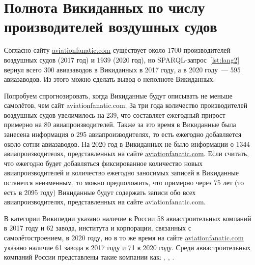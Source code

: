 \section{Полнота Викиданных по числу производителей воздушных судов}

Согласно сайту \href{https://www.aviationfanatic.com/}{aviationfanatic.com} 
существует около \num{1700} 
производителей воздушных судов\autocite{count_of_aircraft_manufactures} (2017 год) 
и \num{1939} (2020 год), 
но SPARQL-запрос~\ref{lst:lang2} вернул всего 300 авиазаводов в Викиданных в 2017 году, 
а в 2020 году~--- 595 авиазаводов. Из этого можно сделать вывод о неполноте Викиданных.  

Попробуем спрогнозировать, когда Викиданные будут описывать не меньше самолётов, 
чем сайт aviationfanatic.com. 
За три года количество производителей воздушных судов увеличилось на 239, 
что составляет ежегодный прирост примерно на 80 авиапроизводителей. 
Также за это время в Викиданные была занесена информация о 295 авиапроизводителях, 
то есть ежегодно добавляется около сотни авиазаводов. 
На 2020 год в Викиданных не было информации о \num{1344} авиапроизводителях, 
представленных на сайте \href{https://www.aviationfanatic.com/}{aviationfanatic.com}. 
Если считать, что ежегодно будет добавляться фиксированное количество новых авиапроизводителей 
и количество ежегодно заносимых записей в Викиданные останется неизменным, 
то можно предположить, что примерно через 75 лет (то есть в 2095 году) 
Викиданные будут содержать записи обо всех авиапроизводителях, представленных на сайте aviationfanatic.com.

В категории Википедии  указано наличие в России 58 авиастроительных компаний в 2017 году 
и 62 завода, института и корпорации, связанных с самолётостроением, в 2020 году, 
но в то же время на сайте \href{https://www.aviationfanatic.com/}{aviationfanatic.com} 
указано наличие 61 завода\autocite{count_plants_of_aircrafts} в 2017 году и 71 в 2020 году. 
Среди авиастроительных компаний России 
представлены такие компании как: , , .



